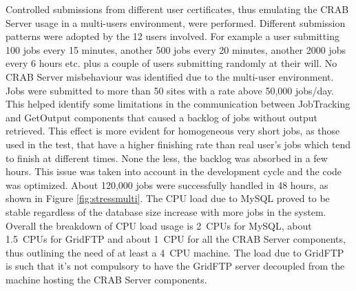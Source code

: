 %
%

Controlled submissions from different user certificates, thus 
emulating the CRAB Server usage in a multi-users environment, were performed.
Different submission patterns were adopted by the 12 users
involved. For example a user submitting 100 jobs every 15 minutes,
another 500 jobs every 20 minutes, another 2000 jobs every 6 hours
etc. plus a couple of users submitting randomly at their will.  No
CRAB Server misbehaviour was identified due to the multi-user
environment. %
Jobs were submitted to more than 50 sites with a rate above 50,000 jobs/day.
This helped identify some limitations in the communication between 
JobTracking and GetOutput components that caused a backlog of jobs without output retrieved. This effect is more evident for homogeneous very short
jobs, as those used in the test, that have a higher finishing rate
than real user's jobs which tend to finish at different times. None
the less, the backlog was absorbed in a few hours. This issue was
taken into account in the development cycle and the code was
optimized.  About 120,000 jobs were successfully handled in 48 hours,
as shown in Figure \ref{fig:stressmulti}.  The CPU load due to MySQL
proved to be stable regardless of the database size increase with more
jobs in the system. Overall the breakdown of CPU load usage is 2~CPUs
for MySQL, about 1.5~CPUs for GridFTP and about 1~CPU for all the CRAB
Server components, thus outlining the need of at least a 4~CPU
machine.  The load due to GridFTP is such that it's not compulsory to
have the GridFTP server decoupled from the machine hosting the CRAB
Server components.

